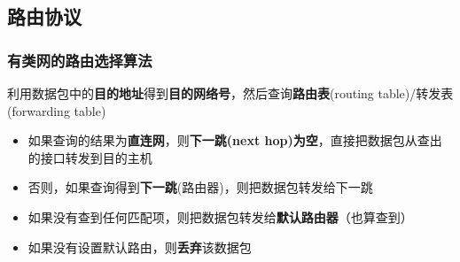 

\subsection{路由协议}
\subsubsection{有类网的路由选择算法}
利用数据包中的\textbf{目的地址}得到\textbf{目的网络号}，然后查询\textbf{路由表}(routing table)/转发表(forwarding table)
\begin{itemize}
	\item 如果查询的结果为\textbf{直连网}，则\textbf{下一跳(next hop)为空}，直接把数据包从查出的接口转发到目的主机
	\item 否则，如果查询得到\textbf{下一跳}(路由器)，则把数据包转发给下一跳
	\item 如果没有查到任何匹配项，则把数据包转发给\textbf{默认路由器}（也算查到）
	\item 如果没有设置默认路由，则\textbf{丢弃}该数据包
\end{itemize}

